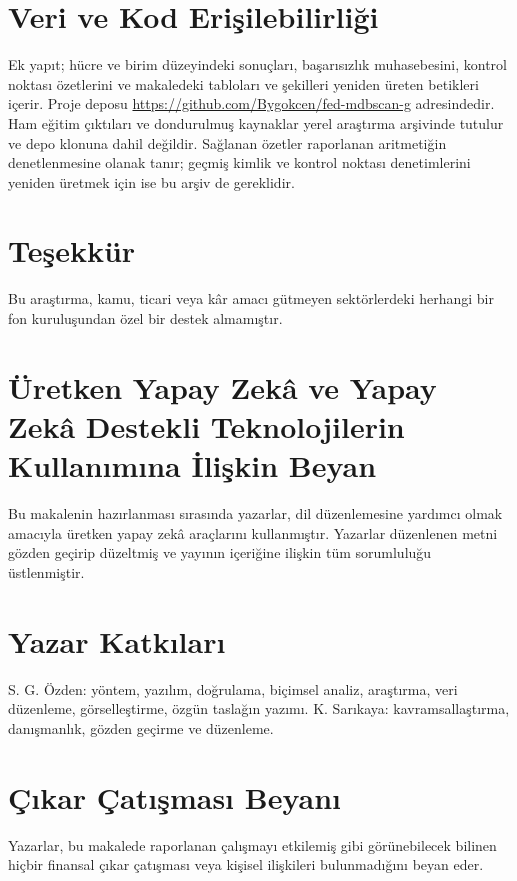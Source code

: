 \documentclass[journal]{IEEEtran}
\begin{document}
\section*{Veri ve Kod Erişilebilirliği}
Ek yapıt; hücre ve birim düzeyindeki sonuçları, başarısızlık muhasebesini, kontrol noktası özetlerini ve makaledeki tabloları ve şekilleri yeniden üreten betikleri içerir. Proje deposu \url{https://github.com/Bygokcen/fed-mdbscan-g} adresindedir. Ham eğitim çıktıları ve dondurulmuş kaynaklar yerel araştırma arşivinde tutulur ve depo klonuna dahil değildir. Sağlanan özetler raporlanan aritmetiğin denetlenmesine olanak tanır; geçmiş kimlik ve kontrol noktası denetimlerini yeniden üretmek için ise bu arşiv de gereklidir.

\section*{Teşekkür}
Bu araştırma, kamu, ticari veya kâr amacı gütmeyen sektörlerdeki herhangi bir fon kuruluşundan özel bir destek almamıştır.

\section*{Üretken Yapay Zekâ ve Yapay Zekâ Destekli Teknolojilerin Kullanımına İlişkin Beyan}
Bu makalenin hazırlanması sırasında yazarlar, dil düzenlemesine yardımcı olmak amacıyla üretken yapay zekâ araçlarını kullanmıştır. Yazarlar düzenlenen metni gözden geçirip düzeltmiş ve yayının içeriğine ilişkin tüm sorumluluğu üstlenmiştir.

\section*{Yazar Katkıları}
S. G. Özden: yöntem, yazılım, doğrulama, biçimsel analiz, araştırma, veri düzenleme, görselleştirme, özgün taslağın yazımı. K. Sarıkaya: kavramsallaştırma, danışmanlık, gözden geçirme ve düzenleme.

\section*{Çıkar Çatışması Beyanı}
Yazarlar, bu makalede raporlanan çalışmayı etkilemiş gibi görünebilecek bilinen hiçbir finansal çıkar çatışması veya kişisel ilişkileri bulunmadığını beyan eder.



\end{document}
